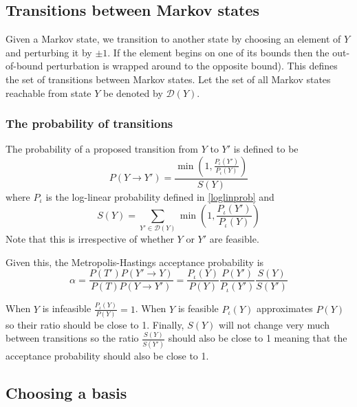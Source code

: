\documentclass{article}
\begin{document}
\subsection{Transitions between Markov states}

Given a Markov state, we transition to another state by choosing an element of  $Y$ and perturbing it by $\pm 1$. If the element begins on one of its bounds then the out-of-bound perturbation is wrapped around to the opposite bound). This defines the set of transitions between Markov states. Let the set of all Markov states reachable from state $Y$ be denoted by $\mathcal{D}(Y)$. 

\subsubsection{The probability of transitions}

The probability of a proposed transition from $Y$ to $Y'$ is defined to be
\[
P(Y \to Y') = \frac{\min\left(1, \frac{P_\iota(Y')}{P_\iota(Y)}\right)}{S(Y)} 
\]
where $P_\iota$ is the log-linear probability defined in \eqref{loglinprob} and
\[
S(Y) = \sum_{Y'\in \mathcal{D}(Y)}\min\left(1, \frac{P_\iota(Y')}{P_\iota(Y)}\right)
\]
Note that this is irrespective of whether $Y$ or $Y'$ are feasible.

Given this, the Metropolis-Hastings acceptance probability is
\[
\alpha = \frac{P(T')P(Y' \to Y)}{P(T)P(Y \to Y')} = 
\frac{P_\iota(Y)}{P(Y)} \frac{P(Y')}{P_\iota(Y')}  \frac{S(Y)}{S(Y')}
\]

When $Y$ is infeasible $\frac{P_\iota(Y)}{P(Y)} = 1$. When $Y$ is feasible $P_\iota(Y)$ approximates $P(Y)$ so their ratio should be close to 1. Finally, $S(Y)$ will not change very much between transitions so the ratio $ \frac{S(Y)}{S(Y')}$ should also be close to 1 meaning that the acceptance probability should also be close to 1.

\subsection{Choosing a basis}
\end{document}
